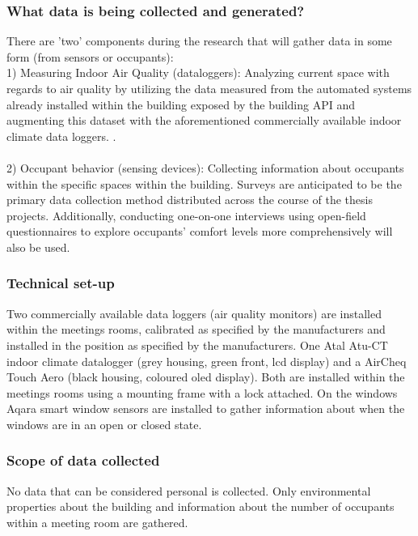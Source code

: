 \documentclass[a4paper]{article}
\begin{document}
\subsubsection{What data is being collected and generated?}

There are 'two' components during the research that will gather data in some form (from sensors or occupants): \\

1) Measuring Indoor Air Quality (dataloggers): Analyzing current space with regards to air quality by utilizing the data measured from the automated systems already installed within the building exposed by the building API and augmenting this dataset with the aforementioned commercially available indoor climate data loggers. . \\\\
2) Occupant behavior (sensing devices): Collecting information about occupants within the specific spaces within the building. Surveys are anticipated to be the primary data collection method distributed across the course of the thesis projects. Additionally, conducting one-on-one interviews using open-field questionnaires to explore occupants’ comfort levels more comprehensively will also be used. 

\subsubsection{Technical set-up}

Two commercially available data loggers (air quality monitors) are installed within the meetings rooms, calibrated as specified by the manufacturers and installed in the position as specified by the manufacturers. One Atal Atu-CT indoor climate datalogger (grey housing, green front, lcd display) and a AirCheq Touch Aero (black housing, coloured oled display). Both are installed within the meetings rooms using a mounting frame with a lock attached. On the windows Aqara smart window sensors are installed to gather information about when the windows are in an open or closed state.

\subsubsection{Scope of data collected}

No data that can be considered personal is collected. Only environmental properties about the building and information about the number of occupants within a meeting room are gathered. 
\end{document}
